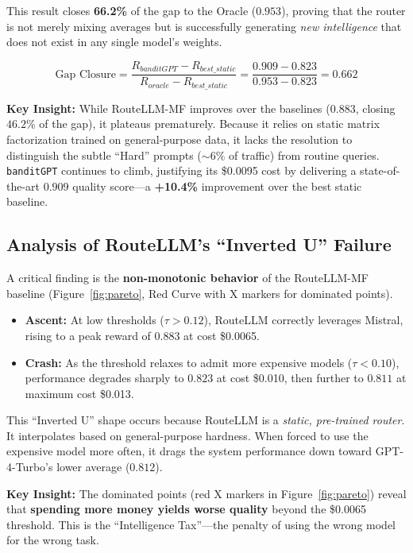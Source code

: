 This result closes \textbf{66.2\%} of the gap to the Oracle ($0.953$), proving that the router is not merely mixing averages but is successfully generating \textit{new intelligence} that does not exist in any single model's weights.

\begin{equation}
\text{Gap Closure} = \frac{R_{banditGPT} - R_{best\_static}}{R_{oracle} - R_{best\_static}} = \frac{0.909 - 0.823}{0.953 - 0.823} = 0.662
\end{equation}

\textbf{Key Insight:} While RouteLLM-MF improves over the baselines ($0.883$, closing $46.2\%$ of the gap), it plateaus prematurely. Because it relies on static matrix factorization trained on general-purpose data, it lacks the resolution to distinguish the subtle ``Hard'' prompts ($\sim 6\%$ of traffic) from routine queries. \texttt{banditGPT} continues to climb, justifying its \$0.0095 cost by delivering a state-of-the-art $0.909$ quality score---a \textbf{+10.4\%} improvement over the best static baseline.

\subsection{Analysis of RouteLLM's ``Inverted U'' Failure}
\label{sec:inverted_u}

A critical finding is the \textbf{non-monotonic behavior} of the RouteLLM-MF baseline (Figure~\ref{fig:pareto}, Red Curve with X markers for dominated points).

\begin{itemize}
    \item \textbf{Ascent:} At low thresholds ($\tau > 0.12$), RouteLLM correctly leverages Mistral, rising to a peak reward of $0.883$ at cost \$0.0065.
    
    \item \textbf{Crash:} As the threshold relaxes to admit more expensive models ($\tau < 0.10$), performance degrades sharply to $0.823$ at cost \$0.010, then further to $0.811$ at maximum cost \$0.013.
\end{itemize}

This ``Inverted U'' shape occurs because RouteLLM is a \textit{static, pre-trained router}. It interpolates based on general-purpose hardness. When forced to use the expensive model more often, it drags the system performance down toward GPT-4-Turbo's lower average ($0.812$). 

\textbf{Key Insight:} The dominated points (red X markers in Figure~\ref{fig:pareto}) reveal that \textbf{spending more money yields worse quality} beyond the \$0.0065 threshold. This is the ``Intelligence Tax''---the penalty of using the wrong model for the wrong task.

